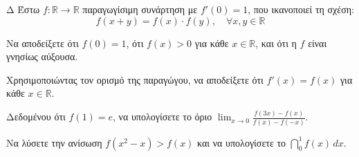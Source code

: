 \begin{thema}{Δ}
Έστω $f: \mathbb{R} \to \mathbb{R}$ παραγωγίσιμη συνάρτηση με $f'(0) = 1$, που ικανοποιεί τη σχέση:
\[ f(x+y) = f(x) \cdot f(y), \quad \forall x, y \in \mathbb{R} \]
\begin{erwthma}
    \item Να αποδείξετε ότι $f(0) = 1$, ότι $f(x) > 0$ για κάθε $x \in \mathbb{R}$, και ότι η $f$ είναι γνησίως αύξουσα.
    \item Χρησιμοποιώντας τον ορισμό της παραγώγου, να αποδείξετε ότι $f'(x) = f(x)$ για κάθε $x \in \mathbb{R}$.
    \item Δεδομένου ότι $f(1) = e$, να υπολογίσετε το όριο $\displaystyle\lim_{x \to 0} \frac{f(3x) - f(x)}{f(x) - f(-x)}$.
    \item Να λύσετε την ανίσωση $f(x^2 - x) > f(x)$ και να υπολογίσετε το $\displaystyle\dint_0^1 f(x)\,dx$.
\end{erwthma}
\end{thema}

